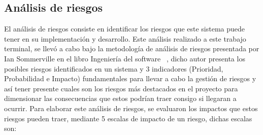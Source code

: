 \subsection{Análisis de riesgos} 

El análisis de riesgos consiste en identificar los riesgos que este sistema puede tener en su implementación y desarrollo. Este análisis realizado a este trabajo terminal, se llevó a cabo bajo la metodología de análisis de riesgos presentada por Ian Sommerville en el libro Ingeniería del software ~\cite{sommerville}, dicho autor presenta los posibles riesgos identificados en un sistema y 3 indicadores (Prioridad, Probabilidad e Impacto) fundamentales para llevar a cabo la gestión de riesgos y así tener presente cuales son los riesgos más destacados en el proyecto para dimensionar las consecuencias que estos podrían traer consigo si llegaran a ocurrir. Para elaborar este análisis de riesgos, se evaluaron los impactos que estos riesgos pueden traer, mediante 5 escalas de impacto de un riesgo, dichas escalas son: 

